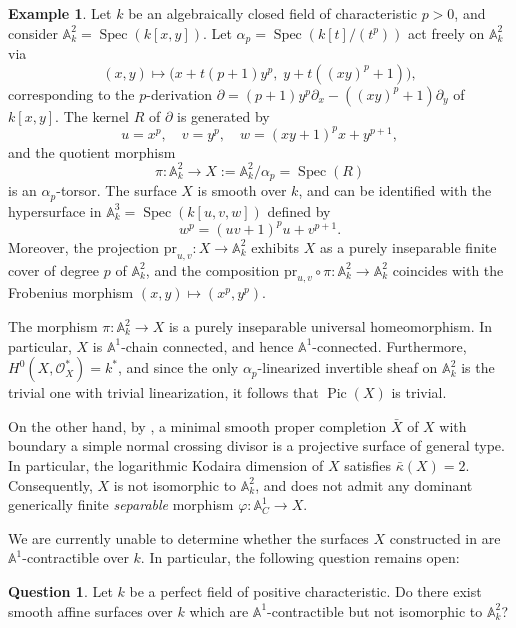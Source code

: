 \documentclass[10pt]{amsart}
\renewcommand{\AA}{\mathbb{A}}
\newcommand{\Spec}{\operatorname{Spec}}
\numberwithin{equation}{section} %
\theoremstyle{plain}
\theoremstyle{definition}
\newtheorem{question}[question]{Question}
\newtheorem{example}[example]{Example}
\theoremstyle{remark}
\newcommand{\Pic}{\operatorname{Pic}}
\begin{document}
\begin{example} \label{exa:annoying}
Let $k$ be an algebraically closed field of characteristic $p>0$, and consider $\AA^2_k=\Spec(k[x,y])$. Let $\alpha_p=\Spec(k[t]/(t^p))$ act freely on $\AA^2_k$ via
\[
(x,y)\longmapsto \bigl(x+t(p+1)y^p,\; y+t((xy)^p+1)\bigr),
\]
corresponding to the $p$-derivation $\partial=(p+1)y^p\partial_x-((xy)^p+1)\partial_y$ of $k[x,y]$. The kernel $R$ of $\partial$ is generated by
\[
u=x^p,\quad v=y^p,\quad w=(xy+1)^px+y^{p+1},
\]
and the quotient morphism
\[
\pi:\AA^2_k\to X:=\AA^2_k/\alpha_p=\Spec(R)
\]
is an $\alpha_p$-torsor. The surface $X$ is smooth over $k$, and can be identified with the hypersurface in $\AA^3_k=\Spec(k[u,v,w])$ defined by
\[
w^p=(uv+1)^pu+v^{p+1}.
\]
Moreover, the projection $\mathrm{pr}_{u,v}:X\to \AA^2_k$ exhibits $X$ as a purely inseparable finite cover of degree $p$ of $\AA^2_k$, and the composition $\mathrm{pr}_{u,v}\circ \pi:\AA^2_k\to \AA^2_k$ coincides with the Frobenius morphism $(x,y)\mapsto (x^p,y^p)$.

The morphism $\pi:\AA^2_k\to X$ is a purely inseparable universal homeomorphism. In particular, $X$ is $\AA^1$-chain connected, and hence $\AA^1$-connected. Furthermore, $H^0(X,\mathcal{O}_X^*)=k^*$, and since the only $\alpha_p$-linearized invertible sheaf on $\AA^2_k$ is the trivial one with trivial linearization, it follows that $\Pic(X)$ is trivial.

On the other hand, by \cite[Example~1.8.3.2]{ItoMiy21}, a minimal smooth proper completion $\bar{X}$ of $X$ with boundary a simple normal crossing divisor is a projective surface of general type. In particular, the logarithmic Kodaira dimension of $X$ satisfies $\bar{\kappa}(X)=2$. Consequently, $X$ is not isomorphic to $\AA^2_k$, and does not admit any dominant generically finite \emph{separable} morphism $\varphi:\AA^1_C\to X$.
\end{example}



We are currently unable to determine whether the surfaces $X$ constructed in  are $\AA^1$-contractible over $k$. In particular, the following question remains open:

\begin{question}
Let $k$ be a perfect field of positive characteristic. Do there exist smooth affine surfaces over $k$ which are $\AA^1$-contractible but not isomorphic to $\AA^2_k$?
\end{question}
\end{document}
